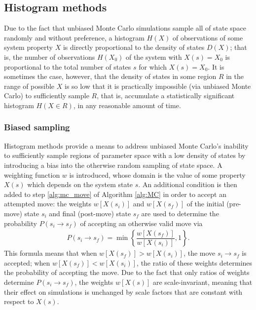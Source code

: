 \documentclass[11pt]{article}
\newcommand{\f}[2]{\dfrac{#1}{#2}} %
\newcommand{\p}[1]{\left(#1\right)} %
\renewcommand{\sp}[1]{\left[#1\right]} %
\renewcommand{\set}[1]{\left\{#1\right\}} %
\begin{document}
\subsection{Histogram methods}
\label{sec:histogram_methods}

Due to the fact that unbiased Monte Carlo simulations sample all of
state space randomly and without preference, a histogram $H\p{X}$ of
observations of some system property $X$ is directly proportional to
the density of states $D\p{X}$; that is, the number of observations
$H\p{X_0}$ of the system with $X\p{s}=X_0$ is proportional to the
total number of states $s$ for which $X\p{s}=X_0$. It is sometimes the
case, however, that the density of states in some region $R$ in the
range of possible $X$ is so low that it is practically impossible (via
unbiased Monte Carlo) to sufficiently sample $R$, that is, accumulate
a statistically significant histogram $H\p{X\in R}$, in any reasonable
amount of time.

\subsubsection{Biased sampling}
\label{sec:biased_sampling}

Histogram methods provide a means to address unbiased Monte Carlo's
inability to sufficiently sample regions of parameter space with a low
density of states by introducing a bias into the otherwise random
sampling of state space. A weighting function $w$ is introduced, whose
domain is the value of some property $X\p{s}$ which depends on the
system state $s$. An additional condition is then added to step
\ref{alg:mc_move} of Algorithm \ref{alg:MC} in order to accept an
attempted move: the weights $w\sp{X\p{s_i}}$ and $w\sp{X\p{s_f}}$ of
the initial (pre-move) state $s_i$ and final (post-move) state $s_f$
are used to determine the probability $P\p{s_i\to s_f}$ of accepting
an otherwise valid move via
\begin{align}
  P\p{s_i\to s_f}=\min\set{\f{w\sp{X\p{s_f}}}{w\sp{X\p{s_i}}},1}.
  \label{eq:move_prob}
\end{align}
This formula means that when $w\sp{X\p{s_f}}>w\sp{X\p{s_i}}$, the move
$s_i\to s_f$ is accepted; when $w\sp{X\p{s_f}}<w\sp{X\p{s_i}}$, the
ratio of these weights determines the probability of accepting the
move. Due to the fact that only ratios of weights determine
$P\p{s_i\to s_f}$, the weights $w\sp{X\p{s}}$ are scale-invariant,
meaning that their effect on simulations is unchanged by scale factors
that are constant with respect to $X\p{s}$.
\end{document}
